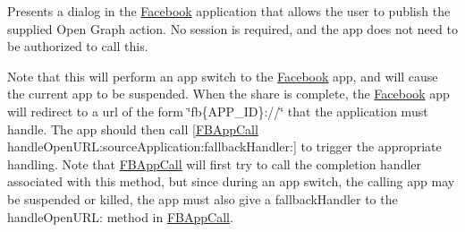 Presents a dialog in the \hyperlink{interfaceFacebook}{Facebook} application that allows the user to publish the supplied Open Graph action. No session is required, and the app does not need to be authorized to call this.

Note that this will perform an app switch to the \hyperlink{interfaceFacebook}{Facebook} app, and will cause the current app to be suspended. When the share is complete, the \hyperlink{interfaceFacebook}{Facebook} app will redirect to a url of the form \char`\"{}fb\{\+A\+P\+P\+\_\+\+I\+D\}\+://\char`\"{} that the application must handle. The app should then call \mbox{[}\hyperlink{interfaceFBAppCall}{F\+B\+App\+Call} handle\+Open\+U\+R\+L\+:source\+Application\+:fallback\+Handler\+:\mbox{]} to trigger the appropriate handling. Note that \hyperlink{interfaceFBAppCall}{F\+B\+App\+Call} will first try to call the completion handler associated with this method, but since during an app switch, the calling app may be suspended or killed, the app must also give a fallback\+Handler to the handle\+Open\+U\+RL\+: method in \hyperlink{interfaceFBAppCall}{F\+B\+App\+Call}.


